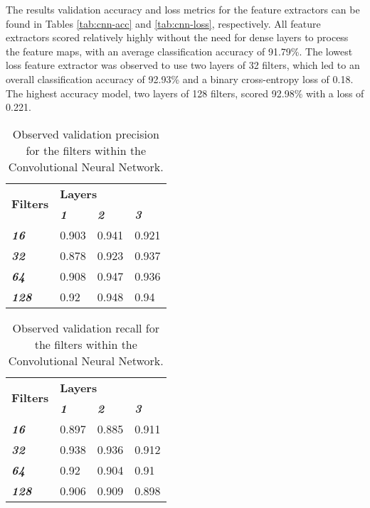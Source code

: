 \documentclass{article}
\begin{document}
The results validation accuracy and loss metrics for the feature extractors can be found in Tables \ref{tab:cnn-acc} and \ref{tab:cnn-loss}, respectively. All feature extractors scored relatively highly without the need for dense layers to process the feature maps, with an average classification accuracy of 91.79\%. The lowest loss feature extractor was observed to use two layers of 32 filters, which led to an overall classification accuracy of 92.93\% and a binary cross-entropy loss of 0.18. The highest accuracy model, two layers of 128 filters, scored 92.98\% with a loss of 0.221. 

\begin{table}[] \footnotesize
\centering
\caption{Observed validation precision for the filters within the Convolutional Neural Network.}
\label{tab:cnn-precision}
\begin{tabular}{@{}llll@{}}
\toprule
\multirow{2}{*}{\textbf{Filters}} & \multicolumn{3}{l}{\textbf{Layers}}                             \\ \cmidrule(l){2-4} 
                                  & \textit{\textbf{1}} & \textit{\textbf{2}} & \textit{\textbf{3}} \\ \cmidrule(r){1-1}
\textit{\textbf{16}}              & 0.903               & 0.941               & 0.921               \\
\textit{\textbf{32}}              & 0.878               & 0.923               & 0.937               \\
\textit{\textbf{64}}              & 0.908               & 0.947               & 0.936               \\
\textit{\textbf{128}}             & 0.92                & 0.948               & 0.94       \\ \bottomrule
\end{tabular}
\end{table}

\begin{table}[] \footnotesize
\centering
\caption{Observed validation recall for the filters within the Convolutional Neural Network.}
\label{tab:cnn-recall}
\begin{tabular}{@{}llll@{}}
\toprule
\multirow{2}{*}{\textbf{Filters}} & \multicolumn{3}{l}{\textbf{Layers}}                             \\ \cmidrule(l){2-4} 
                                  & \textit{\textbf{1}} & \textit{\textbf{2}} & \textit{\textbf{3}} \\ \cmidrule(r){1-1}
\textit{\textbf{16}}              & 0.897               & 0.885               & 0.911               \\
\textit{\textbf{32}}              & 0.938               & 0.936               & 0.912               \\
\textit{\textbf{64}}              & 0.92                & 0.904               & 0.91                \\
\textit{\textbf{128}}             & 0.906               & 0.909               & 0.898               \\ \bottomrule
\end{tabular}
\end{table}
\end{document}
